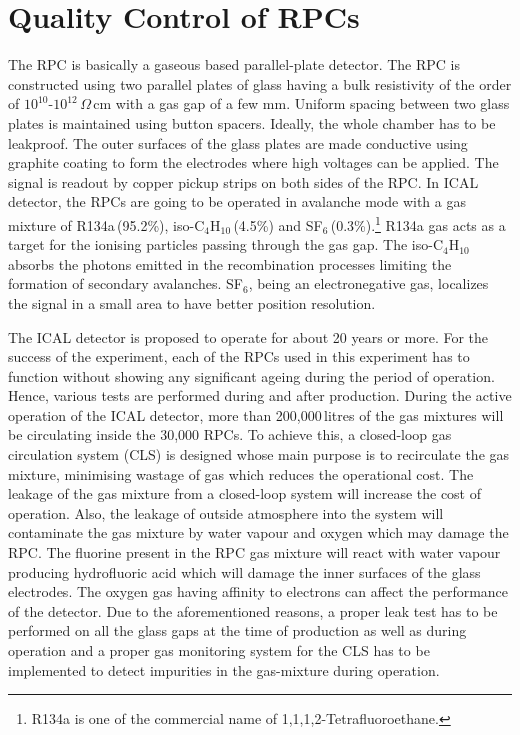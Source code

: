 \documentclass[a4paper,12pt,twoside,openany]{article}
\begin{document}
\section{Quality Control of RPCs}

The RPC is basically a gaseous based parallel-plate detector\cite{rpc_p2}. The RPC is constructed using two parallel plates of glass having a bulk resistivity of the order of $10^{10}$-$10^{12}$\,$\Omega$\,cm with a gas gap of a few mm. Uniform spacing between two glass plates is maintained using button spacers. Ideally, the whole chamber has to be leakproof. The outer surfaces of the glass plates are made conductive using graphite coating to form the electrodes where high voltages can be applied. The signal is readout by copper pickup strips on both sides of the RPC. In ICAL detector, the RPCs are going to be operated in avalanche mode with a gas mixture of R134a\,(95.2\%), iso-C$_4$H$_{10}$\,(4.5\%) and SF$_6$\,(0.3\%).\footnote{R134a is one of the commercial name of 1,1,1,2-Tetrafluoroethane.} R134a gas acts as a target for the ionising particles passing through the gas gap. The iso-C$_4$H$_{10}$ absorbs the photons emitted in the recombination processes limiting the formation of secondary avalanches. SF$_6$, being an electronegative gas, localizes the signal in a small area to have better position resolution.

The ICAL detector is proposed to operate for about 20 years or more. For the success of the experiment, each of the RPCs used in this experiment has to function without showing any significant ageing during the period of operation. Hence, various tests are performed during and after production. During the active operation of the ICAL detector, more than 200,000\,litres of the gas mixtures will be circulating inside the 30,000 RPCs. To achieve this, a closed-loop gas circulation system (CLS) is designed whose main purpose is to recirculate the gas mixture, minimising wastage of gas which reduces the operational cost. The leakage of the gas mixture from a closed-loop system will increase the cost of operation. Also, the leakage of outside atmosphere into the system will contaminate the gas mixture by water vapour and oxygen which may damage the RPC\cite{rpc_c,rpc_w}. The fluorine present in the RPC gas mixture will react with water vapour producing hydrofluoric acid which will damage the inner surfaces of the glass electrodes. The oxygen gas having affinity to electrons can affect the performance of the detector. Due to the aforementioned reasons, a proper leak test has to be performed on all the glass gaps at the time of production as well as during operation and a proper gas monitoring system for the CLS has to be implemented to detect impurities in the gas-mixture during operation.
\end{document}
